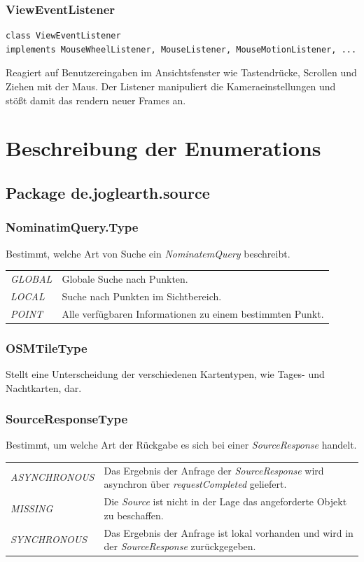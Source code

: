 \documentclass[10pt]{scrreprt}
\begin{document}
\vspace{5mm}
\subsection*{ViewEventListener}
\begin{lstlisting}
class ViewEventListener
implements MouseWheelListener, MouseListener, MouseMotionListener, ...
\end{lstlisting}
Reagiert auf Benutzereingaben im Ansichtsfenster wie Tastendrücke, Scrollen und Ziehen mit der Maus. Der Listener manipuliert die Kameraeinstellungen und stößt damit das rendern neuer Frames an.



\chapter{Beschreibung der Enumerations}
\section*{Package de.joglearth.source}

\subsection*{NominatimQuery.Type}
Bestimmt, welche Art von Suche ein \textit{NominatemQuery} beschreibt.\\[3mm]
\begin{tabular}{p{4cm} p{11cm}}
\textit{GLOBAL} & Globale Suche nach Punkten. \\
\textit{LOCAL} & Suche nach Punkten im Sichtbereich. \\
\textit{POINT} & Alle verfügbaren Informationen zu einem bestimmten Punkt. \\
\end{tabular}

\vspace{5mm}
\subsection*{OSMTileType}
Stellt eine Unterscheidung der verschiedenen Kartentypen, wie Tages- und Nachtkarten, dar.

\vspace{5mm}
\subsection*{SourceResponseType}
Bestimmt, um welche Art der Rückgabe es sich bei einer \textit{SourceResponse} handelt.\\[3mm]
\begin{tabular}{p{4cm} p{11cm}}
\textit{ASYNCHRONOUS} & Das Ergebnis der Anfrage der \textit{SourceResponse} wird asynchron über \textit{requestCompleted} geliefert.\\
\textit{MISSING} & Die \textit{Source} ist nicht in der Lage das angeforderte Objekt zu beschaffen.\\
\textit{SYNCHRONOUS} & Das Ergebnis der Anfrage ist lokal vorhanden und wird in der \textit{SourceResponse} zurückgegeben.\\
\end{tabular}
\end{document}
